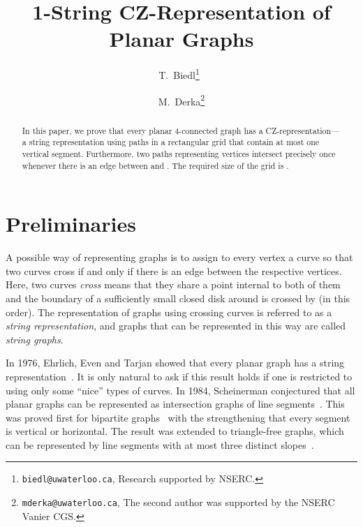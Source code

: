 \documentclass{article}
\begin{document}
\title{1-String CZ-Representation of Planar Graphs}

\author{T.~Biedl\thanks{\texttt{biedl@uwaterloo.ca}, Research supported by NSERC.}~}
\author{M.~Derka\thanks{\texttt{mderka@uwaterloo.ca}, The second author was supported by the NSERC Vanier CGS.}}



\renewcommand\Authands{~and~}





\maketitle

\begin{abstract}
In this paper, we prove that every planar 4-connected graph has a CZ-representation---a
string representation using paths in a rectangular grid that contain at most one vertical segment. 
Furthermore, two paths representing vertices  intersect precisely once whenever there
is an edge between  and . The required size of the grid is .
\end{abstract}




\section{Preliminaries}

A possible way of representing graphs is to assign to every vertex a curve so
that two curves cross if and only if there is an edge between the respective vertices. 
Here, two curves  \emph{cross} means that
they share a point  internal to both of them and 
the boundary of a sufficiently small closed disk around  
is crossed by  (in this order).
The representation of graphs using crossing curves is referred to as a \emph{string representation},
and graphs that can be represented in this way are called \emph{string graphs}.

In 1976, Ehrlich, Even and Tarjan showed that every planar graph has a string representation~\cite{cit:tarjan}.
It is only natural to ask if this result holds if one is restricted to using
only some ``nice'' types of curves. In 1984, Scheinerman conjectured that all planar graphs can
be represented as intersection graphs of line segments~\cite{cit:scheinerman}.
This was proved first for bipartite graphs~\cite{cit:arroyo, cit:pach} with the strengthening
that every segment is vertical or horizontal. The result was extended to triangle-free
graphs, which can be represented by line segments with at most three distinct slopes~\cite{cit:castro}.
\end{document}
